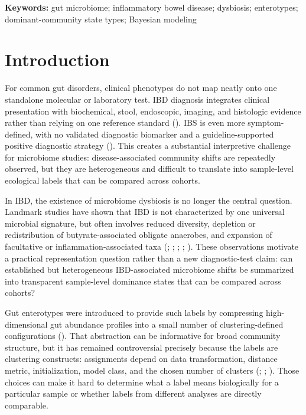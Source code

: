 \documentclass[
  11pt,
]{article}
\begin{document}
\textbf{Keywords:} gut microbiome; inflammatory bowel disease;
dysbiosis; enterotypes; dominant-community state types; Bayesian
modeling

\section{Introduction}\label{introduction}

For common gut disorders, clinical phenotypes do not map neatly onto one
standalone molecular or laboratory test. IBD diagnosis integrates
clinical presentation with biochemical, stool, \mbox{endoscopic},
imaging, and histologic evidence rather than relying on one reference standard
(). IBS is even more symptom-defined, with no validated diagnostic
biomarker and a guideline-supported positive diagnostic strategy
(). This creates a
substantial interpretive challenge for microbiome studies:
disease-associated community shifts are repeatedly observed, but they are
heterogeneous and difficult to translate into sample-level ecological
labels that can be compared across cohorts.

In IBD, the existence of microbiome dysbiosis is no longer the central
question. Landmark studies have shown that IBD is not characterized by
one universal microbial signature, but often involves reduced diversity,
depletion or redistribution of butyrate-associated obligate anaerobes,
and expansion of facultative or inflammation-associated taxa
(;
;
;
;
). These
observations motivate a practical representation question rather than a
new diagnostic-test claim: can established but heterogeneous
IBD-associated microbiome shifts be summarized into transparent
sample-level dominance states that can be compared across cohorts?

Gut enterotypes were introduced to provide such labels by compressing
high-dimensional gut abundance profiles into a small number of
clustering-defined configurations
(). That
abstraction can be informative for broad community structure, but it has
remained controversial precisely because the labels are clustering
constructs: assignments depend on data transformation, distance metric,
initialization, model class, and the chosen number of clusters
(;
;
). Those
choices can make it hard to determine what a label means biologically
for a particular sample or whether labels from different analyses are
directly comparable.
\end{document}
